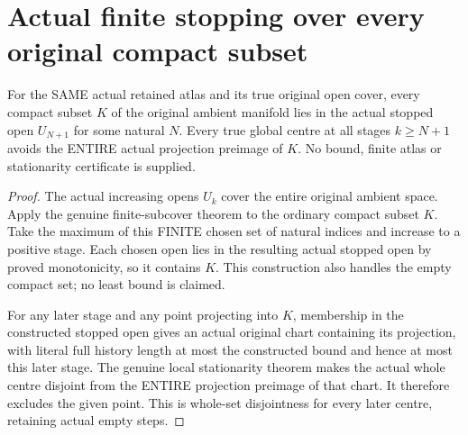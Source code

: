 \section{Actual finite stopping over every original compact subset}

\begin{lemma}
\label{hir:sharp-actual-curve-compact-stopped-open-bound}
\leanok
For the SAME actual retained atlas and its true original open cover, every
compact subset $K$ of the original ambient manifold lies in the actual
stopped open $U_{N+1}$ for some natural $N$. Every true global centre at
all stages $k\ge N+1$ avoids the ENTIRE actual projection preimage of $K$.
No bound, finite atlas or stationarity certificate is supplied.
\end{lemma}
\begin{proof}
The actual increasing opens $U_k$ cover the entire original ambient space.
Apply the genuine finite-subcover theorem to the ordinary compact subset
$K$. Take the maximum of this FINITE chosen set of natural indices and
increase to a positive stage. Each chosen open lies in the resulting
actual stopped open by proved monotonicity, so it contains $K$. This
construction also handles the empty compact set; no least bound is claimed.

For any later stage and any point projecting into $K$, membership in the
constructed stopped open gives an actual original chart containing its
projection, with literal full history length at most the constructed
bound and hence at most this later stage. The genuine local stationarity
theorem makes the actual whole centre disjoint from the ENTIRE projection
preimage of that chart. It therefore excludes the given point. This is
whole-set disjointness for every later centre, retaining actual empty steps.
\end{proof}

